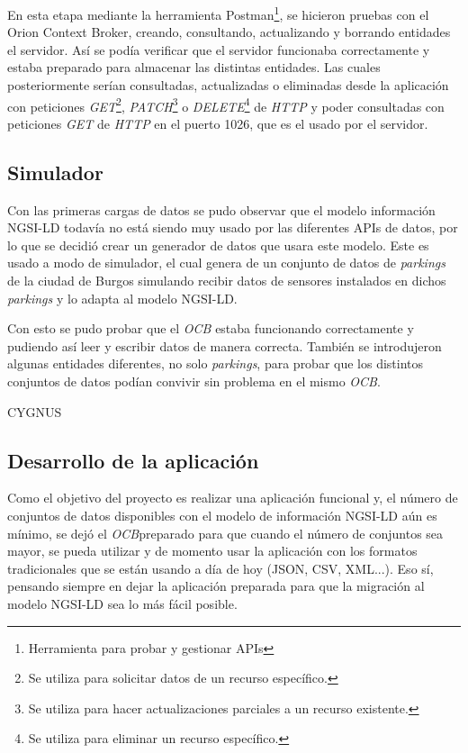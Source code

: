 En esta etapa mediante la herramienta Postman\footnote{Herramienta para probar y gestionar APIs}, se hicieron pruebas con el Orion Context Broker, creando, consultando, actualizando y borrando entidades el servidor. Así se podía verificar que el servidor funcionaba correctamente y estaba preparado para almacenar las distintas entidades.
Las cuales posteriormente serían consultadas, actualizadas o eliminadas desde la aplicación con peticiones \textit{GET}\footnote{Se utiliza para solicitar datos de un recurso específico.}, \textit{PATCH}\footnote{Se utiliza para hacer actualizaciones parciales a un recurso existente.} o \textit{DELETE}\footnote{Se utiliza para eliminar un recurso específico.} de \textit{HTTP} y poder consultadas con peticiones \textit{GET} de \textit{HTTP} en el puerto 1026, que es el usado por el servidor.
\label{fig:post-postman}

\subsection{Simulador}\label{simulador}

Con las primeras cargas de datos se pudo observar que el modelo información NGSI-LD todavía no está siendo muy usado por las diferentes APIs de datos, por lo que se decidió crear un generador de datos que usara este modelo. Este es usado a modo de simulador, el cual genera de un conjunto de datos de \textit{parkings} de la ciudad de Burgos simulando recibir datos de sensores instalados en dichos \textit{parkings} y lo adapta al modelo NGSI-LD. 

\label{fig:get-postman}


Con esto se pudo probar que el \textit{OCB}\footnotemark{} estaba funcionando correctamente y pudiendo así leer y escribir datos de manera correcta. También se introdujeron algunas entidades diferentes, no solo \textit{parkings}, para probar que los distintos conjuntos de datos podían convivir sin problema en el mismo \textit{OCB}\footnotemark[\value{footnote}]. 


CYGNUS


\subsection{Desarrollo de la aplicación}

Como el objetivo del proyecto es realizar una aplicación funcional y, el número de conjuntos de datos disponibles con el modelo de información NGSI-LD aún es mínimo, se dejó el \textit{OCB}\footnotemark[\value{footnote}] preparado para que cuando el número de conjuntos sea mayor, se pueda utilizar y de momento usar la aplicación con los formatos tradicionales que se están usando a día de hoy (JSON, CSV, XML...). Eso sí, pensando siempre en dejar la aplicación preparada para que la migración al modelo NGSI-LD sea lo más fácil posible.

